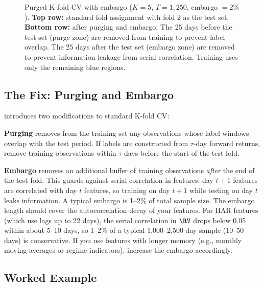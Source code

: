 \begin{figure}[ht]
\begin{tikzpicture}
\end{tikzpicture}
\caption{Purged K-fold CV with embargo ($K=5$, $T=1{,}250$, embargo $= 2\%$).
\textbf{Top row:} standard fold assignment with fold 2 as the test set.
\textbf{Bottom row:} after purging and embargo.
The 25 days before the test set (\textcolor{warnred}{purge zone}) are removed from training to prevent label overlap.
The 25 days after the test set (\textcolor{prereqpurple}{embargo zone}) are removed to prevent information leakage from serial correlation.
Training uses only the remaining blue regions.}
\label{fig:purged-cv}
\end{figure}

\subsection{The Fix: Purging and Embargo}

\citet{LopezdePrado2018} introduces two modifications to standard K-fold CV:

\begin{definition}[Purging]
\textbf{Purging} removes from the training set any observations whose label windows overlap with the test period.
If labels are constructed from $\tau$-day forward returns, remove training observations within $\tau$ days before the start of the test fold.
\end{definition}

\begin{definition}[Embargo]
\textbf{Embargo} removes an additional buffer of training observations \emph{after} the end of the test fold.
This guards against serial correlation in features: day $t+1$ features are correlated with day $t$ features, so training on day $t+1$ while testing on day $t$ leaks information.
A typical embargo is 1--2\% of total sample size.
The embargo length should cover the autocorrelation decay of your features.
For HAR features (which use lags up to 22 days), the serial correlation in $\RV$ drops below 0.05 within about 5--10 days, so 1--2\% of a typical 1,000--2,500 day sample (10--50 days) is conservative.
If you use features with longer memory (e.g., monthly moving averages or regime indicators), increase the embargo accordingly.
\end{definition}

\subsection{Worked Example}

